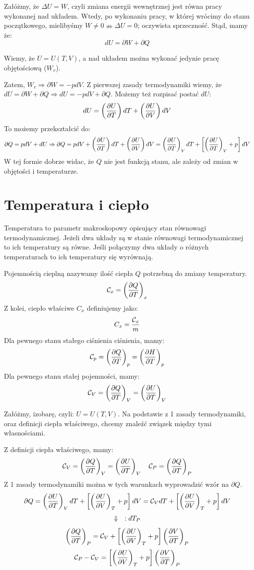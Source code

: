 \documentclass{../notatki}
\begin{document}
Załóżmy, że $\Delta U = W$, czyli zmiana energii wewnętrznej jest równa pracy
wykonanej nad układem. Wtedy, po wykonaniu pracy, w której wrócimy do
stanu początkowego, mielibyśmy $W \neq 0 \nRightarrow \Delta U = 0$; oczywista
sprzeczność. Stąd, mamy że:
$$
dU = \partial W + \partial Q
$$

\begin{examplebox}
  Wiemy, że $U = U(T, V)$, a nad układem można wykonać jedynie pracę
  objętościową ($W_v$).

  \vspace{1em}
  Zatem, $W_v \Rightarrow \partial W = - pdV$. Z pierwszej zasady termodynamiki
  wiemy, że $dU = \partial W + \partial Q \Rightarrow dU = -pdV + \partial Q$.
  Możemy też rozpisać postać $dU$:
  $$
  dU = \left(\frac{\partial U}{\partial T}\right) dT +
  \left(\frac{\partial U}{\partial V}\right) dV
  $$
  To możemy przekształcić do:
  $$
  \partial Q = pdV + dU \Rightarrow \partial Q = pdV +
  \left(\frac{\partial U}{\partial T}\right) dT +
  \left(\frac{\partial U}{\partial V}\right) dV =
  \left(\frac{\partial U}{\partial T}\right)_VdT +
  \left[\left(\frac{\partial U}{\partial T}\right)_V + p\right] dV
  $$
  W tej formie dobrze widac, że $Q$ nie jest funkcją stanu, ale zależy od
  zmian w objętości i temperaturze.
\end{examplebox}

\section{Temperatura i ciepło}

Temperatura to parametr makroskopowy opisujący stan równowagi termodynamicznej.
Jeżeli dwa układy są w stanie równowagi termodynamicznej to ich temperatury są
równe. Jeśli połączymy dwa układy o różnych temperaturach to ich temperatury
się wyrównają.

Pojemnością cieplną nazywamy ilość ciepła $Q$ potrzebną do zmiany temperatury.
$$
\mathcal{C}_x = \left(\frac{\partial Q}{\partial T}\right)_x
$$
Z kolei, ciepło właściwe $C_x$ definiujemy jako:
$$
C_x = \frac{\mathcal{C}_x}{m}
$$
Dla pewnego stanu stałego ciśnienia ciśnienia, mamy:
$$
\mathcal{C}_p = \left(\frac{\partial Q}{\partial T}\right)_p = \left(\frac{\partial H}{\partial T}\right)_p
$$
Dla pewnego stanu stałej pojemności, mamy:
$$
\mathcal{C}_V = \left(\frac{\partial Q}{\partial T}\right)_V =
\left(\frac{\partial U}{\partial T}\right)_V
$$

\begin{examplebox}
  Załóżmy, izobarę, czyli: $U = U(T, V)$. Na podstawie z 1 zasady termodynamiki,
  oraz definicji ciepła właściwego, chcemy znaleźć związek między
  tymi własnościami.

  \vspace{1em}
  Z definicji ciepła właściwego, mamy:
  $$
  \mathcal{C}_V = \left(\frac{\partial Q}{\partial T}\right)_V =
  \left(\frac{\partial U}{\partial T}\right)_V \quad \mathcal{C}_P =
  \left(\frac{\partial Q}{\partial T}\right)_P
  $$
  Z 1 zasady termodynamiki można w tych warunkach wyprowadzić wzór na
  $\partial Q$.
  $$
  \partial Q = \left(\frac{\partial U}{\partial T}\right)_V dT +
  \left[\left(\frac{\partial U}{\partial V}\right)_T + p\right]dV =
  \mathcal{C}_V dT + \left[\left(\frac{\partial U}{\partial V}\right)_T + p\right]dV
  $$
  $$
  \Downarrow \quad :dT_P \\
  $$
  $$
  \left(\frac{\partial Q}{\partial T}\right)_P = \mathcal{C}_V + \left[\left(\frac{\partial U}{\partial V}\right)_T + p\right]\left(\frac{\partial V}{\partial T}\right)_P
  $$
  $$
  \mathcal{C}_P - \mathcal{C}_V = \left[\left(\frac{\partial U}{\partial V}\right)_T + p\right]\left(\frac{\partial V}{\partial T}\right)_P
  $$

\end{examplebox}
\end{document}
